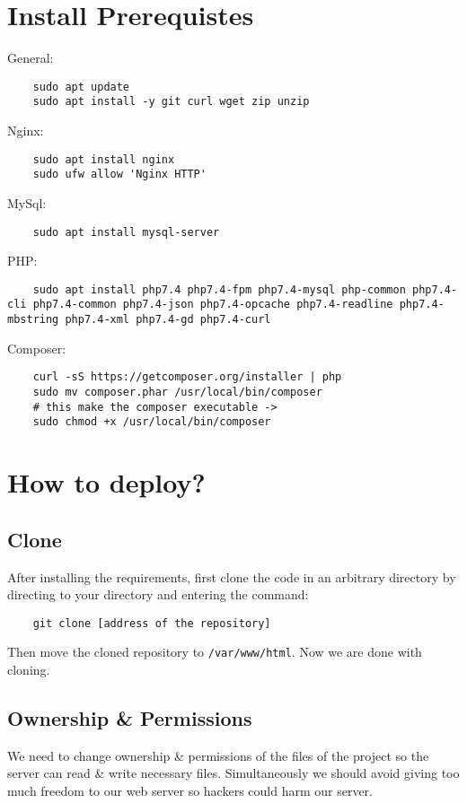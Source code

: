 \documentclass[12pt]{article}
\begin{document}
\section{Install Prerequistes}
General:
\begin{verbatim}
    sudo apt update
    sudo apt install -y git curl wget zip unzip
\end{verbatim}
Nginx:
\begin{verbatim}
    sudo apt install nginx
    sudo ufw allow 'Nginx HTTP'
\end{verbatim}
MySql:
\begin{verbatim}
    sudo apt install mysql-server
\end{verbatim}
PHP:
\begin{verbatim}
    sudo apt install php7.4 php7.4-fpm php7.4-mysql php-common php7.4-cli php7.4-common php7.4-json php7.4-opcache php7.4-readline php7.4-mbstring php7.4-xml php7.4-gd php7.4-curl
\end{verbatim}
Composer:
\begin{verbatim}
    curl -sS https://getcomposer.org/installer | php
    sudo mv composer.phar /usr/local/bin/composer
    # this make the composer executable -> 
    sudo chmod +x /usr/local/bin/composer
\end{verbatim}
\section{How to deploy?}
\subsection{Clone}
After installing the requirements, first clone the code in an arbitrary directory by directing to your directory and entering the command:
\begin{verbatim}
    git clone [address of the repository]
\end{verbatim}
Then move the cloned repository to \verb|/var/www/html|. Now we are done with cloning.
\subsection{Ownership \& Permissions}
We need to change ownership \& permissions of the files of the project so the server can read \& write necessary files. Simultaneously we should avoid giving too much freedom to our web server so hackers could harm our server.
\end{document}
